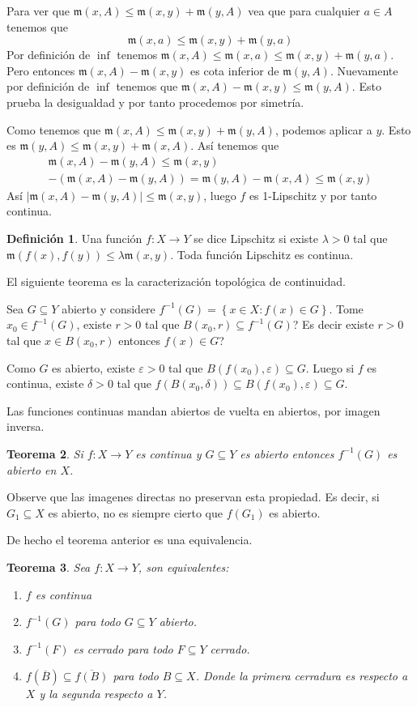 \documentclass[12pt]{article}
\theoremstyle{plain}
\newtheorem{Th}{Teorema}[subsection]   %
\theoremstyle{definition}
\newtheorem{Def}[Th]{Definición}       %
\theoremstyle{remark}
\numberwithin{equation}{section}
\newcommand{\mm}{\mathfrak{m}}      %
\renewcommand{\leq}{\leqslant}      %
\renewcommand{\:}{\colon}           %
\newcommand{\conj}[1]{\left\lbrace#1\right\rbrace}
\begin{document}
\begin{multicols}{2}
\begin{ptcb}
Para ver que $\mm(x,A)\leq \mm(x,y)+\mm(y,A)$ vea que para cualquier $a\in A$ tenemos que
$$\mm(x,a)\leq \mm(x,y)+\mm(y,a)$$
Por definición de $\inf$ tenemos $\mm(x,A)\leq \mm(x,a)\leq\mm(x,y)+\mm(y,a) $. Pero entonces $\mm(x,A)-\mm(x,y)$ es cota inferior de $\mm(y,A)$. Nuevamente por definición de $\inf$ tenemos que $\mm(x,A)-\mm(x,y)\leq \mm(y,A)$. Esto prueba la desigualdad y por tanto procedemos por simetría.\par
Como tenemos que $\mm(x,A)\leq\mm(x,y)+\mm(y,A)$, podemos aplicar a $y$. Esto es $\mm(y,A)\leq\mm(x,y)+\mm(x,A)$. Así tenemos que
\begin{gather*}
  \mm(x,A)-\mm(y,A)\leq\mm(x,y)\\
  -(\mm(x,A)-\mm(y,A))=\mm(y,A)-\mm(x,A)\leq\mm(x,y)
\end{gather*}
Así $|\mm(x,A)-\mm(y,A)|\leq\mm(x,y)$, luego $f$ es 1-Lipschitz y por tanto continua.
\end{ptcb}
\begin{Def}
  Una función $f\colon X\to Y$ se dice Lipschitz si existe $\lambda >0$ tal que $\mm(f(x),f(y))\leq \lambda\mm(x,y)$. Toda función Lipschitz es continua.
\end{Def}

El siguiente teorema es la caracterización topológica de continuidad. \par
Sea $G\subseteq Y$ abierto y considere $f^{-1}(G)=\conj{x\in X\colon f(x)\in G}$. Tome $x_0\in f^{-1}(G)$, existe $r>0$ tal que $B(x_0,r)\subseteq f^{-1}(G)$? Es decir existe $r>0$ tal que $x\in B(x_0,r)$ entonces $f(x)\in G$?\par
Como $G$ es abierto, existe $\varepsilon>0$ tal que $B(f(x_0),\varepsilon)\subseteq G$. Luego si $f$ es continua, existe $\delta>0$ tal que $f(B(x_0,\delta))\subseteq B(f(x_0),\varepsilon)\subseteq G$.\par Las funciones continuas mandan abiertos de vuelta en abiertos, por imagen inversa.

\begin{Th}\label{thm:ContinuidadConTopo}
  Si $f\colon X\to Y$ es continua y $G\subseteq Y$ es abierto entonces $f^{-1}(G)$ es abierto en $X$.
\end{Th}

Observe que las imagenes directas no preservan esta propiedad. Es decir, si $G_1\subseteq X$ es abierto, no es siempre cierto que $f(G_1)$ es abierto.\par
De hecho el teorema anterior es una equivalencia.
\begin{Th}
  Sea $f\colon X\to Y$, son equivalentes:
  \begin{enumerate}
    \item $f$ es continua
    \item $f^{-1}(G)$ para todo $G\subseteq Y$ abierto.
    \item $f^{-1}(F)$ es cerrado para todo $F\subseteq Y$ cerrado.
    \item $f(\overline{B})\subseteq \overline{f(B)}$ para todo $B\subseteq X$. Donde la primera cerradura es respecto a $X$ y la segunda respecto a $Y$.
  \end{enumerate}
\end{Th}


\end{multicols}
\end{document}
